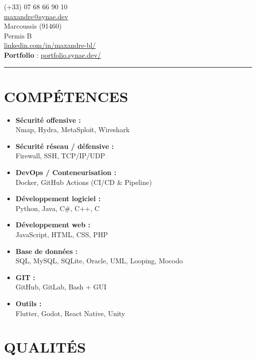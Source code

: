 \documentclass[10pt,a4paper]{article}
\begin{document}
\begin{minipage}[t]{0.30\linewidth}
\vspace{0pt}

(+33) 07 68 66 90 10\\
\href{mailto:maxandre@synae.dev}{maxandre@synae.dev}\\
Marcoussis (91460)\\
Permis B\\
\href{https://www.linkedin.com/in/maxandre-bl/}{linkedin.com/in/maxandre-bl/}\\[4pt]
\textbf{Portfolio} : \href{https://portfolio.synae.dev/}{portfolio.synae.dev/}

\color{lightgray}\rule{\linewidth}{0.4pt}
\color{black}

\vspace{-6pt}
\section*{COMPÉTENCES}

\begin{itemize}
  \item \textbf{Sécurité offensive :}\\
    Nmap, Hydra, MetaSploit, Wireshark
  \item \textbf{Sécurité réseau / défensive :}\\
    Firewall, SSH, TCP/IP/UDP
  \item \textbf{DevOps / Conteneurisation :}\\
    Docker, GitHub Actions (CI/CD \& Pipeline)
  \item \textbf{Développement logiciel :}\\
    Python, Java, C\#, C++, C
  \item \textbf{Développement web :}\\
    JavaScript, HTML, CSS, PHP
  \item \textbf{Base de données :}\\
    SQL, MySQL, SQLite, Oracle, UML, Looping, Mocodo
  \item \textbf{GIT :}\\
    GitHub, GitLab, Bash + GUI
  \item \textbf{Outils :}\\
    Flutter, Godot, React Native, Unity
\end{itemize}

\section*{QUALITÉS}


\end{minipage}
\end{document}
